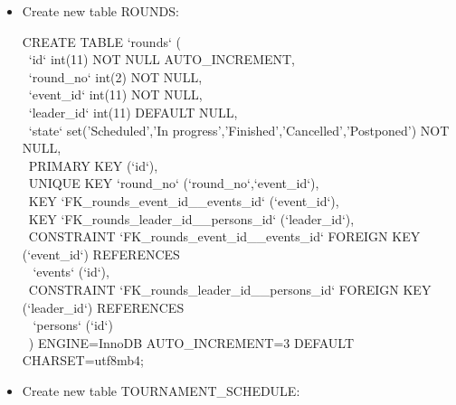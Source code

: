 \documentclass[titlepage]{article}
\begin{document}
\begin{itemize}
\item Create new table ROUNDS: \vspace{1em}

\hspace{15pt}CREATE TABLE `rounds` ( \\
\-\ \hspace{30pt}`id` int(11) NOT NULL AUTO\_INCREMENT, \\
\-\ \hspace{30pt}`round\_no` int(2) NOT NULL, \\
\-\ \hspace{30pt}`event\_id` int(11) NOT NULL, \\
\-\ \hspace{30pt}`leader\_id` int(11) DEFAULT NULL, \\
\-\ \hspace{30pt}`state` set('Scheduled','In progress','Finished','Cancelled','Postponed') NOT NULL, \\
\-\ \hspace{30pt}PRIMARY KEY (`id`), \\
\-\ \hspace{30pt}UNIQUE KEY `round\_no` (`round\_no`,`event\_id`), \\
\-\ \hspace{30pt}KEY `FK\_rounds\_event\_id\_\_events\_id` (`event\_id`), \\
\-\ \hspace{30pt}KEY `FK\_rounds\_leader\_id\_\_persons\_id` (`leader\_id`), \\
\-\ \hspace{30pt}CONSTRAINT `FK\_rounds\_event\_id\_\_events\_id` FOREIGN KEY (`event\_id`) REFERENCES \\ \-\ \hspace{30pt} `events` (`id`), \\
\-\ \hspace{30pt}CONSTRAINT `FK\_rounds\_leader\_id\_\_persons\_id` FOREIGN KEY (`leader\_id`) REFERENCES \\ \-\ \hspace{30pt} `persons` (`id`) \\
\-\ \hspace{15pt}) ENGINE=InnoDB AUTO\_INCREMENT=3 DEFAULT CHARSET=utf8mb4;

\vspace{1em}

\item Create new table TOURNAMENT\_SCHEDULE: \vspace{1em}


\end{itemize}
\end{document}
